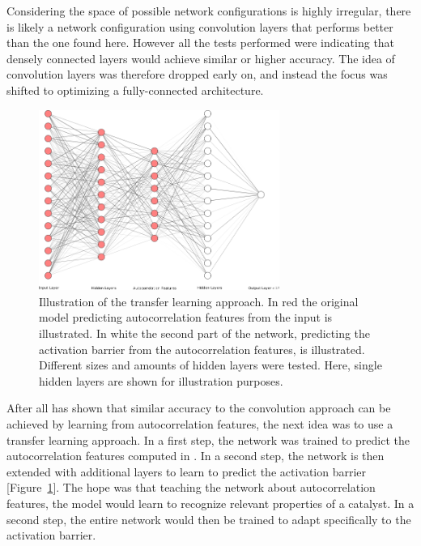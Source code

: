 Considering the space of possible network configurations is highly irregular, there is likely a network configuration using convolution layers 
that performs better than the one found here.
However all the tests performed were indicating that densely connected layers would achieve similar or higher accuracy.
The idea of convolution layers was therefore dropped early on, and instead the focus was shifted to optimizing a fully-connected architecture.
\\ 
\begin{figure} [H]
    \centering
    \includegraphics[width=0.7\textwidth]{figures/regression/fourier/nn.png} 
    \caption[Transfer learning model]{Illustration of the transfer learning approach.
        In red the original model predicting autocorrelation features from the input is illustrated.
        In white the second part of the network, predicting the activation barrier from the autocorrelation features, is illustrated.
        Different sizes and amounts of hidden layers were tested. Here, single hidden layers are shown for illustration purposes.
    }
    \label{fig:transferlearn}
\end{figure}

After all \cite{friederich_dos} has shown that similar accuracy to the convolution approach can be achieved by learning from autocorrelation features,
the next idea was to use a transfer learning approach.
In a first step, the network was trained to predict the autocorrelation features computed in \cite{friederich_dos}.
In a second step, the network is then extended with additional layers to learn to predict the activation barrier [Figure~\ref{fig:transferlearn}].
The hope was that teaching the network about autocorrelation features, the model would learn to recognize relevant properties of a catalyst.
In a second step, the entire network would then be trained to adapt specifically to the activation barrier.
\\

